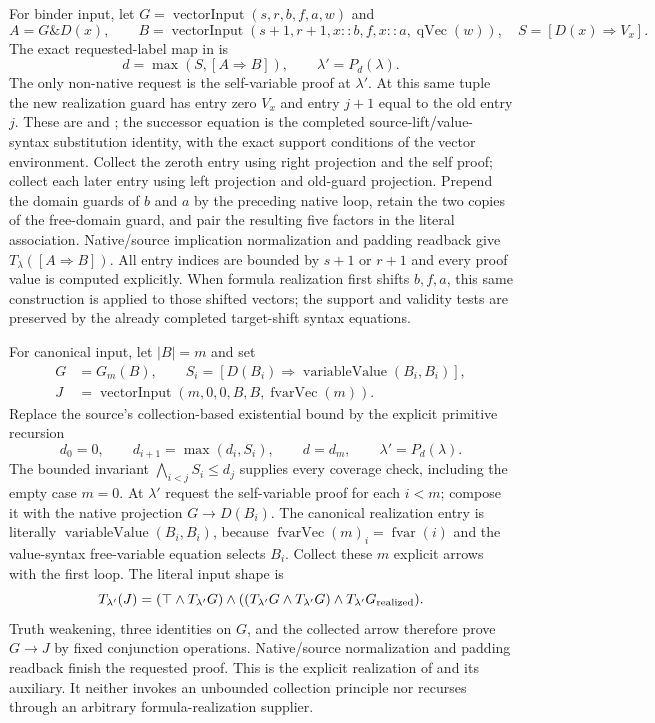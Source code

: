 For binder input, let
$G=\operatorname{vectorInput}(s,r,b,f,a,w)$ and
\[
 A=G\mathbin\&D(x),\qquad
 B=\operatorname{vectorInput}
       (s+1,r+1,x::b,f,x::a,\operatorname{qVec}(w)),
 \quad S=[D(x)\Rightarrow V_x].
\]
The exact requested-label map in
 is
\[
 d=\max(S,[A\Rightarrow B]),\qquad
 \lambda'=P_d(\lambda).
 \tag{T15}
\]
The only non-native request is the self-variable proof at $\lambda'$.
At this same tuple the new realization guard has entry zero $V_x$
and entry $j+1$ equal to the old entry $j$.  These are
 and
; the successor equation is
the completed source-lift/value-syntax substitution identity, with
the exact support conditions of the vector environment.
Collect the zeroth entry using right projection and the self proof;
collect each later entry using left projection and old-guard
projection.  Prepend the domain guards of $b$ and $a$ by the
preceding native loop, retain the two copies of the free-domain
guard, and pair the resulting five factors in the literal
 association.  Native/source implication
normalization and padding readback give $T_\lambda([A\Rightarrow B])$.
All entry indices are bounded by $s+1$ or $r+1$ and every proof
value is computed explicitly.  When formula realization first
shifts $b,f,a$, this same construction is applied to those shifted
vectors; the support and validity tests are preserved by the
already completed target-shift syntax equations.

For canonical input, let $|B|=m$ and set
\begin{align*}
 G&=G_m(B),\qquad
 S_i=[D(B_i)\Rightarrow\operatorname{variableValue}(B_i,B_i)],\\
 J&=\operatorname{vectorInput}(m,0,0,B,B,\operatorname{fvarVec}(m)).
\end{align*}
Replace the source's collection-based existential bound by the
explicit primitive recursion
\[
 d_0=0,\qquad d_{i+1}=\max(d_i,S_i),\qquad
 d=d_m,\qquad \lambda'=P_d(\lambda).
 \tag{T16}
\]
The bounded invariant $\bigwedge_{i<j}S_i\le d_j$ supplies every
coverage check, including the empty case $m=0$.
At $\lambda'$ request the self-variable proof for each $i<m$;
compose it with the native projection $G\to D(B_i)$.
The canonical realization entry is literally
$\operatorname{variableValue}(B_i,B_i)$, because
$\operatorname{fvarVec}(m)_i=\operatorname{fvar}(i)$ and the
value-syntax free-variable equation selects $B_i$.
Collect these $m$ explicit arrows with the first loop.
The literal input shape is
\[
 T_{\lambda'}(J)=
 (\top\wedge T_{\lambda'}G)\wedge
   ((T_{\lambda'}G\wedge T_{\lambda'}G)\wedge
       T_{\lambda'}G_{\rm realized}).
\]
Truth weakening, three identities on $G$, and the collected arrow
therefore prove $G\to J$ by fixed conjunction operations.
Native/source normalization and padding readback finish the
requested proof.  This is the explicit realization of
 and its
 auxiliary.  It neither invokes an
unbounded collection principle nor recurses through an arbitrary
formula-realization supplier.

